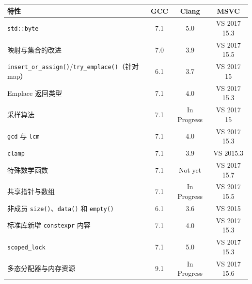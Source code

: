 \begin{table}[H]
\centering
\begin{tabularx}{\textwidth}{X c c c}
\toprule
特性 & GCC & Clang & MSVC \\
\midrule
\texttt{std::byte} & 7.1 & 5.0 & VS 2017 15.3 \\
映射与集合的改进 & 7.0 & 3.9 & VS 2017 15.5 \\
\texttt{insert\_or\_assign()}/\texttt{try\_emplace()}（针对 map） & 6.1 & 3.7 & VS 2017 15 \\
Emplace 返回类型 & 7.1 & 4.0 & VS 2017 15.3 \\
采样算法 & 7.1 & In Progress & VS 2017 15 \\
\texttt{gcd} 与 \texttt{lcm} & 7.1 & 4.0 & VS 2017 15.3 \\
\texttt{clamp} & 7.1 & 3.9 & VS 2015.3 \\
特殊数学函数 & 7.1 & Not yet & VS 2017 15.7 \\
共享指针与数组 & 7.1 & In Progress & VS 2017 15.5 \\
非成员 \texttt{size()}、\texttt{data()} 和 \texttt{empty()} & 6.1 & 3.6 & VS 2015 \\
标准库新增 \texttt{constexpr} 内容 & 7.1 & 4.0 & VS 2017 15.3 \\
\texttt{scoped\_lock} & 7.1 & 5.0 & VS 2017 15.3 \\
多态分配器与内存资源 & 9.1 & In Progress & VS 2017 15.6 \\
\bottomrule
\end{tabularx}
\end{table}
